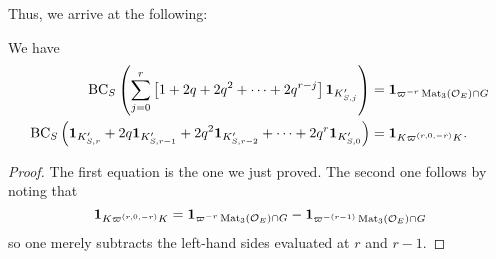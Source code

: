 Thus, we arrive at the following:
\begin{proposition}
  We have
  \begin{align*}
    \operatorname{BC}_S \left(
    \sum_{j=0}^r \left[ 1 + 2q + 2q^2 + \dots + 2q^{r-j} \right]
    \mathbf{1}_{K'_{S,j}} \right)
    &= \mathbf{1}_{\varpi^{-r} \operatorname{Mat}_3(\mathcal O_E) \cap G} \\
    \operatorname{BC}_S \left(
    \mathbf{1}_{K'_{S,r}}
    + 2q \mathbf{1}_{K'_{S,r-1}}
    + 2q^2 \mathbf{1}_{K'_{S,r-2}}
    + \dots
    + 2q^r \mathbf{1}_{K'_{S,0}} \right)
    &= \mathbf{1}_{K\varpi^{(r,0,-r)}K}.
  \end{align*}
\end{proposition}
\begin{proof}
  The first equation is the one we just proved.
  The second one follows by noting that
  \[
    \mathbf{1}_{K\varpi^{(r,0,-r)}K}
    = \mathbf{1}_{\varpi^{-r} \operatorname{Mat}_3(\mathcal O_E) \cap G}
    - \mathbf{1}_{\varpi^{-(r-1)} \operatorname{Mat}_3(\mathcal O_E) \cap G}
  \]
  so one merely subtracts the left-hand sides evaluated at $r$ and $r-1$.
\end{proof}
